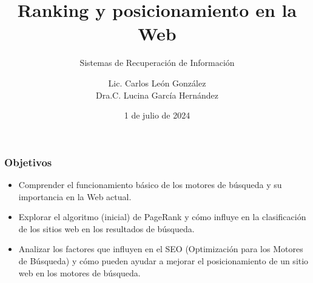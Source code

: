 \documentclass[
10pt, %
aspectratio=169, %
]{beamer}
\title[Short Title]{Ranking y posicionamiento en la Web}
\subtitle{Sistemas de Recuperación de Información}
\author{Lic. Carlos León González \\ Dra.C. Lucina García Hernández}
\institute[UC]{Facultad de Matem\'atica y Computaci\'on \\ Universidad de La Habana \\ \smallskip }
\date{1 de julio de  2024} %
\begin{document}
	
	
	
	\begin{frame}
		\titlepage
	\end{frame}
	
	\begin{frame}
		
		\frametitle{Objetivos}
		
		\begin{itemize}

			\item Comprender el funcionamiento básico de los motores de búsqueda y su importancia en la Web actual. \\[2mm]
			
			\item Explorar el algoritmo (inicial) de PageRank y cómo influye en la clasificación de los sitios web en los resultados de búsqueda. \\[2mm]
			
			\item Analizar los factores que influyen en el SEO (Optimización para los Motores de Búsqueda) y cómo pueden ayudar a mejorar el posicionamiento de un sitio web en los motores de búsqueda.
			
		\end{itemize}
		
	\end{frame}
	
\end{document}
